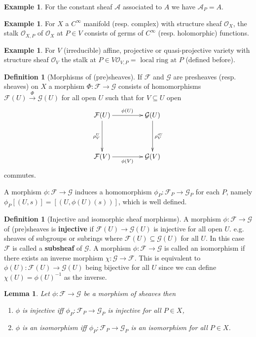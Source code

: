 \documentclass[10pt,]{book}
\newcommand{\terminology}[1]{\textbf{#1}}
\theoremstyle{plain}
\newtheorem{lemma}[theorem]{Lemma}
\theoremstyle{definition}
\newtheorem{definition}[theorem]{Definition}
\newtheorem{example}[theorem]{Example}
\newcommand{\A}{\mathcal{A}}
\newcommand{\F}{\mathcal{F}}
\newcommand{\G}{\mathcal{G}}
\newcommand{\cO}{\mathcal{O}}
\begin{document}
\begin{example}\label{example-4}
For the constant sheaf \(\A\) associated to \(A\) we have \(\A_P = A\).
          \end{example}
\begin{example}\label{example-5}
For \(X\) a \(C^\infty\) manifold (resp. complex) with structure sheaf \(\cO_X\), the stalk \(\cO_{X,P}\) of \(\cO_X\) at \(P\in V\) consists of germs of \(C^\infty\) (resp. holomorphic) functions.
          \end{example}
\begin{example}\label{example-6}
For \(V\) (irreducible) affine, projective or quasi-projective variety with structure sheaf \(\cO_V\) the stalk at \(P\in V\)\(\cO_{V,P} = \text{ local ring at } P\) (defined before).
          \end{example}
\begin{definition}[Morphisms of (pre)sheaves]\label{definition-4}
If \(\F\) and \(\G\) are presheaves (resp. sheaves) on \(X\) a morphism \(\Phi\colon \F \to \G\) consists of homomorphisms \(\F(U) \xrightarrow{\Phi} \G(U)\) for all open \(U\) such that for \(V \subseteq U\) open
            \[\xymatrix@R+2em@C+2em{
              \F(U) \ar[r]^{\phi(U)} \ar[d]_{\rho^U_V} & \G(U) \ar[d]^{\rho'^U_V} \\
              \F(V) \ar[r]_{\phi(V)} & \G(V)
              }
            \]
            commutes.
          \end{definition}
\par
A morphism \(\phi\colon \F \to \G\) induces a homomorphism \(\phi_P\colon \F_P \to \G_P\) for each \(P\), namely \(\phi_P[(U,s)] = [(U,\phi(U)(s))]\), which is well defined.%
\begin{definition}[Injective and isomorphic sheaf morphisms]\label{definition-5}
A morphism \(\phi\colon \F\to\G\) of (pre)sheaves is \terminology{injective} if \(\F(U) \to \G(U)\) is injective for all open \(U\).
            e.g. sheaves of subgroups or subrings where \(\F(U) \subseteq \G(U)\) for all \(U\).
            In this case \(\F\) is called a \terminology{subsheaf} of \(\G\).\newline{}
            A morphism \(\phi\colon \F \to \G\) is called an isomorphism if there exists an inverse morphism \(\chi\colon \G\to\F\).
            This is equivalent to \(\phi(U)\colon \F(U) \to \G(U)\) being bijective for all \(U\) since we can define \(\chi(U) = \phi(U)^{-1}\) as the inverse.
          \end{definition}
\begin{lemma}\label{lemma-1}
Let \(\phi\colon \F\to\G\) be a morphism of sheaves then
            \begin{enumerate}
\item{}\(\phi\) is injective iff \(\phi_P\colon \F_P \to \G_P\) is injective for all \(P\in X\),\item{}\(\phi\) is an isomorphism iff \(\phi_P\colon \F_P \to \G_P\) is an isomorphism for all \(P\in X\).\end{enumerate}
\end{lemma}
\end{document}
